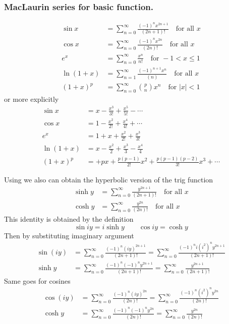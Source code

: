 \documentclass[../../../main.tex]{subfiles}
\begin{document}
\subsubsection{MacLaurin series for basic function.}
\begin{align*}
    \sin x    & = \sum_{n=0}^{\infty}\frac{(-1)^nx^{2n+1}}{(2n+1)!} \quad \text{for all }x    \\
    \cos x    & = \sum_{n=0}^{\infty}\frac{(-1)^nx^{2n}}{(2n)!}\quad \text{for all }x         \\
    e^x       & = \sum_{n=0}^{\infty}\frac{x^{n}}{n!}               \quad\text{for }-1<x\leq1 \\
    \ln (1+x) & = \sum_{n=1}^{\infty} \frac{(-1)^{n+1}x^{n}}{(n)} \quad \text{for all }x      \\
    (1+x)^p   & =\sum_{n=0}^{\infty}\binom{p}{n}x^n \quad \text{for }|x|<1
\end{align*}
or more explicitly
\begin{align*}
    \sin x    & =x-\frac{x^3}{3!}+\frac{x^5}{5!}-\cdots                     \\
    \cos x    & = 1-\frac{x^2}{2!}+\frac{x^4}{4!}+\cdots                    \\
    e^x       & =1+x+\frac{x^2}{2!}+\frac{x^3}{3!}                          \\
    \ln (1+x) & =x-\frac{x^2}{2}+\frac{x^3}{3}-\frac{x^4}{4}                \\
    (1+x)^p   & =+px+\frac{p(p-1)}{2!}x^2 +\frac{p(p-1)(p-2)}{3!}x^3+\cdots
\end{align*}

Using we also can obtain the hyperbolic version of the trig function
\begin{align*}
    \sinh y & =  \sum_{n=0}^{\infty} \frac{y^{2n+1}}{(2n + 1)!}\quad \text{for all }x \\
    \cosh y & =  \sum_{n=0}^{\infty} \frac{y^{2n}}{(2n)!}\quad \text{for all }x       
\end{align*}
This identity is obtained by the definition
\begin{equation*}
    \sin iy  = i \sinh y \qquad
    \cos iy  =\cosh y
\end{equation*}
Then by substituting imaginary argument
\begin{align*}
    \sin(iy) & =  \sum_{n=0}^{\infty} \frac{(-1)^n (iy)^{2n+1}}{(2n + 1)!}
    =  \sum_{n=0}^{\infty} \frac{(-1)^n i(i^2)^n y^{2n+1}}{(2n + 1)!}            \\
    \sinh y
             & =    \sum_{n=0}^{\infty} \frac{(-1)^n (-1)^n y^{2n+1}}{(2n + 1)!}
    = \sum_{n=0}^{\infty} \frac{y^{2n+1}}{(2n + 1)!}
\end{align*}
Same goes for cosines
\begin{align*}
    \cos(iy) & =  \sum_{n=0}^{\infty} \frac{(-1)^{n} (iy)^{2n}}{(2n)!}
    =  \sum_{n=0}^{\infty} \frac{(-1)^{n} (i^2)^n y^{2n}}{(2n)!}            \\
    \cosh y
             & =   \sum_{n=0}^{\infty} \frac{(-1)^{n} (-1)^n y^{2n}}{(2n)!}
    =   \sum_{n=0}^{\infty} \frac{y^{2n}}{(2n)!}
\end{align*}
\end{document}
